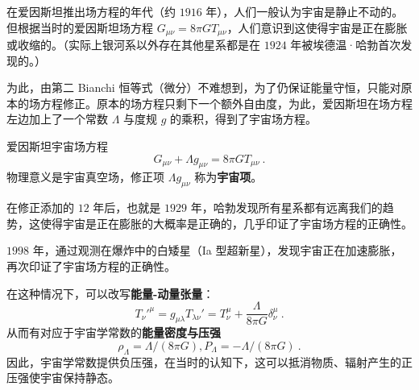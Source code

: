

在爱因斯坦推出场方程的年代（约 $1916$ 年），人们一般认为宇宙是静止不动的。但根据当时的爱因斯坦场方程 $ G_{\mu \nu} = 8 \pi G  T_{\mu \nu}$，人们意识到这使得宇宙是正在膨胀或收缩的。（实际上银河系以外存在其他星系都是在 $1924$ 年被埃德温·哈勃首次发现的。）

为此，由第二 Bianchi 恒等式（微分）不难想到，为了仍保证能量守恒，只能对原本的场方程修正。原本的场方程只剩下一个额外自由度，为此，爱因斯坦在场方程左边加上了一个常数 $\Lambda$ 与度规 $g$ 的乘积，得到了宇宙场方程。

\begin{theorem}{爱因斯坦宇宙场方程}
$$G_{\mu \nu} + \Lambda g_{\mu \nu} = 8\pi G T_{\mu \nu} ~.$$
物理意义是宇宙真空场，修正项 $\Lambda g_{\mu \nu}$ 称为\textbf{宇宙项}。
\end{theorem}

在修正添加的 $12$ 年后，也就是 $1929$ 年，哈勃发现所有星系都有远离我们的趋势，这使得宇宙是正在膨胀的大概率是正确的，几乎印证了宇宙场方程的正确性。

$1998$ 年，通过观测在爆炸中的白矮星（Ia 型超新星），发现宇宙正在加速膨胀，再次印证了宇宙场方程的正确性。

在这种情况下，可以改写\textbf{能量-动量张量}：
\begin{equation}
{{T_{\nu}'}^{\mu}} = g_{\mu \lambda} T_{\lambda \nu}' = T_{\nu}^{\mu} + \frac{\Lambda}{8 \pi G} \delta_{\nu}^{\mu} ~.
\end{equation}
从而有对应于宇宙学常数的\textbf{能量密度与压强}
\begin{equation}
\rho_\Lambda = \Lambda/(8 \pi G), P_\Lambda = -\Lambda/(8 \pi G) ~.
\end{equation}
因此，宇宙学常数提供负压强，在当时的认知下，这可以抵消物质、辐射产生的正压强使宇宙保持静态。